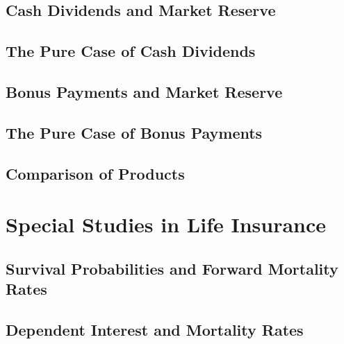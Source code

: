 \documentclass[
]{book}
\begin{document}
\hypertarget{cash-dividends-and-market-reserve}{%
\subsection{Cash Dividends and Market Reserve}\label{cash-dividends-and-market-reserve}}

\hypertarget{the-pure-case-of-cash-dividends}{%
\subsection{The Pure Case of Cash Dividends}\label{the-pure-case-of-cash-dividends}}

\hypertarget{bonus-payments-and-market-reserve}{%
\subsection{Bonus Payments and Market Reserve}\label{bonus-payments-and-market-reserve}}

\hypertarget{the-pure-case-of-bonus-payments}{%
\subsection{The Pure Case of Bonus Payments}\label{the-pure-case-of-bonus-payments}}

\hypertarget{comparison-of-products}{%
\subsection{Comparison of Products}\label{comparison-of-products}}

\hypertarget{special-studies-in-life-insurance}{%
\section{Special Studies in Life Insurance}\label{special-studies-in-life-insurance}}

\hypertarget{survival-probabilities-and-forward-mortality-rates-1}{%
\subsection{Survival Probabilities and Forward Mortality Rates}\label{survival-probabilities-and-forward-mortality-rates-1}}

\hypertarget{dependent-interest-and-mortality-rates}{%
\subsection{Dependent Interest and Mortality Rates}\label{dependent-interest-and-mortality-rates}}
\end{document}
